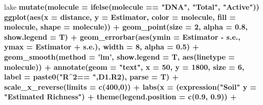 \documentclass[]{article}
\newenvironment{Shaded}{\begin{snugshade}}{\end{snugshade}}
\newcommand{\KeywordTok}[1]{\textcolor[rgb]{0.13,0.29,0.53}{\textbf{#1}}}
\newcommand{\DataTypeTok}[1]{\textcolor[rgb]{0.13,0.29,0.53}{#1}}
\newcommand{\DecValTok}[1]{\textcolor[rgb]{0.00,0.00,0.81}{#1}}
\newcommand{\FloatTok}[1]{\textcolor[rgb]{0.00,0.00,0.81}{#1}}
\newcommand{\StringTok}[1]{\textcolor[rgb]{0.31,0.60,0.02}{#1}}
\newcommand{\OperatorTok}[1]{\textcolor[rgb]{0.81,0.36,0.00}{\textbf{#1}}}
\newcommand{\NormalTok}[1]{#1}
\begin{document}
\begin{Shaded}
\begin{Highlighting}[]
\NormalTok{lake }\OperatorTok{%
\StringTok{  }\KeywordTok{mutate}\NormalTok{(}\DataTypeTok{molecule =} \KeywordTok{ifelse}\NormalTok{(molecule }\OperatorTok{==}\StringTok{ "DNA"}\NormalTok{, }\StringTok{"Total"}\NormalTok{, }\StringTok{"Active"}\NormalTok{)) }\OperatorTok{%
\StringTok{  }\KeywordTok{ggplot}\NormalTok{(}\KeywordTok{aes}\NormalTok{(}\DataTypeTok{x =}\NormalTok{ distance, }\DataTypeTok{y =}\NormalTok{ Estimator, }\DataTypeTok{color =}\NormalTok{ molecule, }\DataTypeTok{fill =}\NormalTok{ molecule, }\DataTypeTok{shape =}\NormalTok{ molecule)) }\OperatorTok{+}\StringTok{ }
\StringTok{  }\KeywordTok{geom_point}\NormalTok{(}\DataTypeTok{size =} \DecValTok{2}\NormalTok{, }\DataTypeTok{alpha =} \FloatTok{0.8}\NormalTok{, }\DataTypeTok{show.legend =}\NormalTok{ T) }\OperatorTok{+}
\StringTok{  }\KeywordTok{geom_errorbar}\NormalTok{(}\KeywordTok{aes}\NormalTok{(}\DataTypeTok{ymin =}\NormalTok{ Estimator }\OperatorTok{-}\StringTok{ }\NormalTok{s.e., }\DataTypeTok{ymax =}\NormalTok{ Estimator }\OperatorTok{+}\StringTok{ }\NormalTok{s.e.), }\DataTypeTok{width =} \DecValTok{8}\NormalTok{, }\DataTypeTok{alpha =} \FloatTok{0.5}\NormalTok{) }\OperatorTok{+}
\StringTok{  }\KeywordTok{geom_smooth}\NormalTok{(}\DataTypeTok{method =} \StringTok{'lm'}\NormalTok{, }\DataTypeTok{show.legend =}\NormalTok{ T, }\KeywordTok{aes}\NormalTok{(}\DataTypeTok{linetype =}\NormalTok{ molecule)) }\OperatorTok{+}
\StringTok{  }\KeywordTok{annotate}\NormalTok{(}\DataTypeTok{geom =} \StringTok{"text"}\NormalTok{, }\DataTypeTok{x =} \DecValTok{50}\NormalTok{, }\DataTypeTok{y =} \DecValTok{1800}\NormalTok{, }\DataTypeTok{size =} \DecValTok{6}\NormalTok{,}
           \DataTypeTok{label =} \KeywordTok{paste0}\NormalTok{(}\StringTok{"R^2== "}\NormalTok{,D1.R2), }\DataTypeTok{parse =}\NormalTok{ T) }\OperatorTok{+}
\StringTok{  }\KeywordTok{scale_x_reverse}\NormalTok{(}\DataTypeTok{limits =} \KeywordTok{c}\NormalTok{(}\DecValTok{400}\NormalTok{,}\DecValTok{0}\NormalTok{)) }\OperatorTok{+}\StringTok{ }
\StringTok{  }\KeywordTok{labs}\NormalTok{(}\DataTypeTok{x =}\NormalTok{ (}\KeywordTok{expression}\NormalTok{(}\StringTok{"Soil"} \OperatorTok{%
       \DataTypeTok{y =} \StringTok{"Estimated Richness"}\NormalTok{) }\OperatorTok{+}
\StringTok{  }\KeywordTok{theme}\NormalTok{(}\DataTypeTok{legend.position =} \KeywordTok{c}\NormalTok{(}\FloatTok{0.9}\NormalTok{, }\FloatTok{0.9}\NormalTok{)) }\OperatorTok{+}
}}}
\end{Highlighting}
\end{Shaded}
\end{document}
